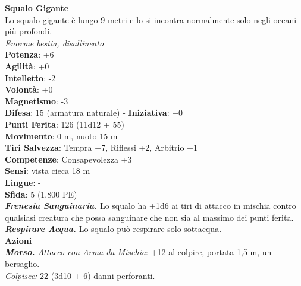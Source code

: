 \begin{multicols}{2}
\medskip\textbf{Squalo Gigante}\\
Lo squalo gigante è lungo 9 metri e lo si incontra normalmente solo negli oceani più profondi.\\
\emph{Enorme bestia, disallineato}\\
\textbf{Potenza}: +6\\
\textbf{Agilità}: +0\\
\textbf{Intelletto}: -2\\
\textbf{Volontà}: +0\\
\textbf{Magnetismo}: -3\\
\textbf{Difesa}: 15 (armatura naturale) - \textbf{Iniziativa}: +0\\
\textbf{Punti Ferita}: 126 (11d12 + 55)\\
\textbf{Movimento}: 0 m, nuoto 15 m\\
\textbf{Tiri Salvezza}: Tempra +7, Riflessi +2, Arbitrio +1\\
\textbf{Competenze}: Consapevolezza +3\\
\textbf{Sensi}: vista cieca 18 m\\
\textbf{Lingue}: -\\
\textbf{Sfida}: 5 (1.800 PE)\smallskip\\
\emph{\textbf{Frenesia Sanguinaria.}} Lo squalo ha +1d6 ai tiri di attacco in mischia contro qualsiasi creatura che possa sanguinare che non sia al massimo dei punti ferita.\\
\emph{\textbf{Respirare Acqua.}} Lo squalo può respirare solo sottacqua.\\
\smallskip\textbf{Azioni}\\
\emph{\textbf{Morso.} Attacco con Arma da Mischia}: +12 al colpire, portata 1,5 m, un bersaglio.\\
\emph{Colpisce:} 22 (3d10 + 6) danni perforanti.\\



\end{multicols}
